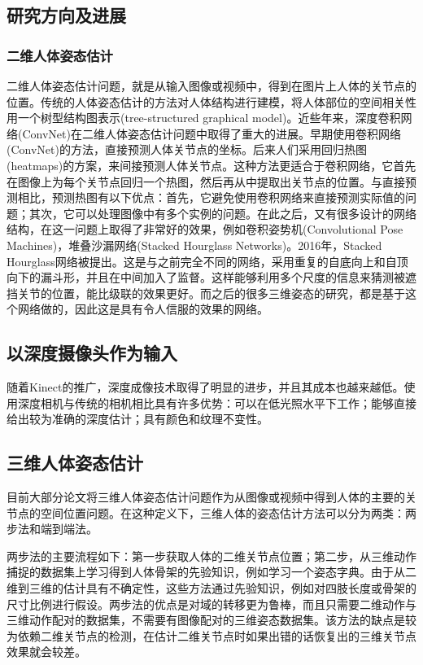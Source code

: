 \begin{refsection}
\subsection{研究方向及进展}
\subsubsection{二维人体姿态估计}
二维人体姿态估计问题，就是从输入图像或视频中，得到在图片上人体的关节点的位置。传统的人体姿态估计的方法对人体结构进行建模，将人体部位的空间相关性用一个树型结构图表示(tree-structured graphical model)\autocite{eichner20122d}。近些年来，深度卷积网络(ConvNet)在二维人体姿态估计问题中取得了重大的进展。早期使用卷积网络(ConvNet)的方法，直接预测人体关节点的坐标\autocite{toshev2014deep}。后来人们采用回归热图(heatmaps)\autocite{pfister2015flowing}的方案，来间接预测人体关节点。这种方法更适合于卷积网络，它首先在图像上为每个关节点回归一个热图，然后再从中提取出关节点的位置。与直接预测相比，预测热图有以下优点：首先，它避免使用卷积网络来直接预测实际值的问题；其次，它可以处理图像中有多个实例的问题。在此之后，又有很多设计的网络结构，在这一问题上取得了非常好的效果，例如卷积姿势机(Convolutional Pose Machines)，堆叠沙漏网络(Stacked Hourglass Networks)\cite{newell2016stacked}。2016年，Stacked Hourglass网络\cite{newell2016stacked}被提出。这是与之前完全不同的网络，采用重复的自底向上和自顶向下的漏斗形，并且在中间加入了监督。这样能够利用多个尺度的信息来猜测被遮挡关节的位置，能比级联的效果更好。而之后的很多三维姿态的研究，都是基于这个网络做的，因此这是具有令人信服的效果的网络。

\subsection{以深度摄像头作为输入}
随着Kinect\autocite{kinect}的推广，深度成像技术取得了明显的进步，并且其成本也越来越低。使用深度相机与传统的相机相比具有许多优势：可以在低光照水平下工作；能够直接给出较为准确的深度估计；具有颜色和纹理不变性。

\subsection{三维人体姿态估计}
目前大部分论文将三维人体姿态估计问题作为从图像或视频中得到人体的主要的关节点的空间位置问题。在这种定义下，三维人体的姿态估计方法可以分为两类：两步法和端到端法。

两步法的主要流程如下：第一步获取人体的二维关节点位置；第二步，从三维动作捕捉的数据集上学习得到人体骨架的先验知识，例如学习一个姿态字典\autocite{zhou2015sparse}。由于从二维到三维的估计具有不确定性，这些方法通过先验知识，例如对四肢长度或骨架的尺寸比例进行假设。两步法的优点是对域的转移更为鲁棒，而且只需要二维动作与三维动作配对的数据集，不需要有图像配对的三维姿态数据集。该方法的缺点是较为依赖二维关节点的检测，在估计二维关节点时如果出错的话恢复出的三维关节点效果就会较差。


\end{refsection}
